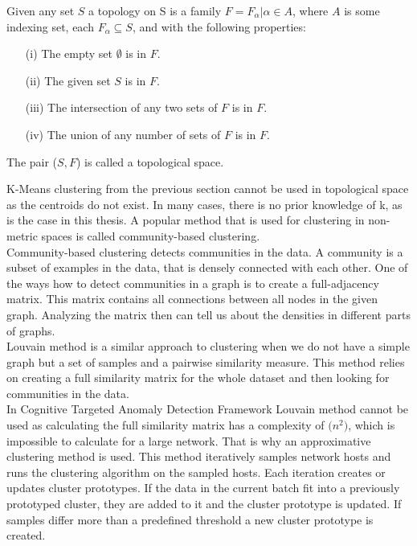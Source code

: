 \documentclass[thesis=B,english]{FITthesis}[2012/10/20]
\begin{document}
Given any set $S$ a topology on S is a family $F ={F_{\alpha} | \alpha \in A}$, where $A$ is some indexing set, each $F_{\alpha}  \subseteq S$, and with the following properties:
\begin{enumerate}                                                                 
    \item [(i)] The empty set $\emptyset$ is in $F$.                                                 
    \item [(ii)] The given set $S$ is in $F$.                                       
    \item [(iii)] The intersection of any two sets of $F$ is in $F$.
    \item [(iv)] The union of any number of sets of $F$ is in $F$.
\end{enumerate} 
The pair ($S, F$) is called a topological space. \\


K-Means clustering from the previous section cannot be used in topological space as the centroids do not exist.
In many cases, there is no prior knowledge of k, as is the case in this thesis.
A popular method that is used for clustering in non-metric spaces is called community-based clustering. \\

Community-based clustering detects communities in the data.
A community is a subset of examples in the data, that is densely connected with each other.
One of the ways how to detect communities in a graph is to create a full-adjacency matrix.
This matrix contains all connections between all nodes in the given graph.
Analyzing the matrix then can tell us about the densities in different parts of graphs.\\

Louvain method is a similar approach to clustering when we do not have a simple graph but a set of samples and a pairwise similarity measure.
This method relies on creating a full similarity matrix for the whole dataset and then looking for communities in the data. \\

In Cognitive Targeted Anomaly Detection Framework Louvain method cannot be used as calculating the full similarity matrix has a complexity of $\mathcal(n^2)$, which is impossible to calculate for a large network.
That is why an approximative clustering method is used.
This method iteratively samples network hosts and runs the clustering algorithm on the sampled hosts.
Each iteration creates or updates cluster prototypes.
If the data in the current batch fit into a previously prototyped cluster, they are added to it and the cluster prototype is updated.
If samples differ more than a predefined threshold a new cluster prototype is created.
\end{document}
